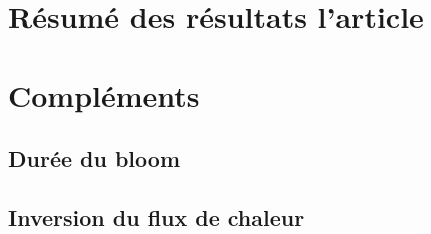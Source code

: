 
\label{chp:res-phenologie}

\minitoc%

\section{Résumé des résultats l'article}
\label{sec:resume-res-phenologie}

\section{Compléments}
\label{sec:complements-phenologie}

\subsection{Durée du bloom}
\label{sec:duree-du-bloom}

\subsection{Inversion du flux de chaleur}
\label{sec:flux-chaleur}
